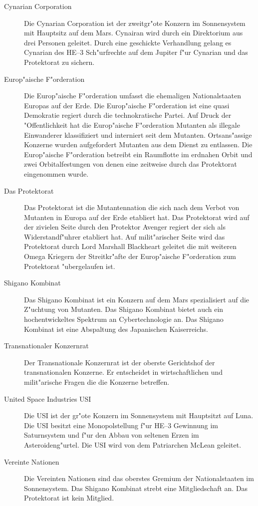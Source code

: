\begin{appendices}
\begin{description}
\item [Cynarian Corporation] Die Cynarian Corporation ist der zweitgr"o\3te Konzern im Sonnensystem mit Hauptsitz auf
      dem Mars. Cynairan wird durch ein Direktorium aus drei Personen geleitet. Durch eine geschickte Verhandlung gelang es Cynarian des HE--3 Sch"urfrechte auf dem Jupiter f"ur Cynarian und das Protektorat zu sichern.
      \item [Europ"aische F"orderation] Die Europ"aische F"orderation umfasst die ehemaligen Nationalstaaten Europas auf der Erde. Die Europ"aische F"orderation ist eine quasi Demokratie regiert durch die technokratische Partei. Auf Druck der "Offentlichkeit hat die Europ"aische F"orderation Mutanten als illegale Einwanderer klassifiziert und interniert seit dem Mutanten. Ortsans"assige Konzerne wurden aufgefordert Mutanten aus dem Dienst zu entlassen. Die Europ"aische F"orderation betreibt ein Raumflotte im erdnahen Orbit und zwei Orbitalfestungen von denen eine zeitweise durch das Protektorat eingenommen wurde.
\item [Das Protektorat] Das Protektorat ist die Mutantennation die sich nach dem Verbot von Mutanten in Europa
      auf der Erde etabliert hat. Das Protektorat wird auf der zivielen Seite durch den Protektor Avenger regiert der sich als Widerstandf"uhrer etabliert hat. Auf milit"arischer Seite wird das Protektorat durch Lord Marshall Blackheart geleitet die mit weiteren Omega Kriegern der Streitkr"afte der Europ"aische F"orderation zum Protektorat "ubergelaufen ist.
\item [Shigano Kombinat] Das Shigano Kombinat ist ein Konzern auf dem Mars spezialisiert auf die Z"uchtung von
      Mutanten. Das Shigano Kombinat bietet auch ein hochentwickeltes Spektrum an Cybertechnologie an. Das Shigano Kombinat ist eine Abspaltung des Japanischen Kaiserreichs.
\item [Transnationaler Konzernrat] Der Transnationale Konzernrat ist der oberste Gerichtshof der transnationalen
      Konzerne. Er entscheidet in wirtschaftlichen und milit"arische Fragen die die Konzerne betreffen.
\item [United Space Industries USI] Die USI ist der gr"o\3te Konzern im Sonnensystem mit Hauptsitzt auf Luna. Die USI
      besitzt eine Monopolstellung f"ur HE--3 Gewinnung im Saturnsystem und f"ur den Abbau von seltenen Erzen im Asteroideng"urtel. Die USI wird von dem Patriarchen McLean geleitet.
\item [Vereinte Nationen] Die Vereinten Nationen sind das oberstes Gremium der Nationalstaaten im Sonnensystem. Das
      Shigano Kombinat strebt eine Mitgliedschaft an. Das Protektorat ist kein Mitglied.
\end{description}


\end{appendices}
